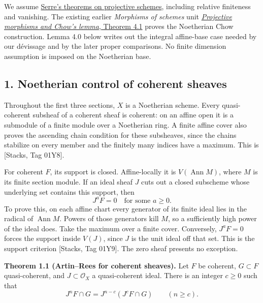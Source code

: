 \documentclass[11pt]{article}
\begin{document}
We assume \href{serres-theorems-on-projective-schemes.md}{Serre's
theorems on projective schemes}, including relative finiteness and
vanishing. The existing earlier \emph{Morphisms of schemes} unit
\href{../AG-GS/prerequisites/AG-MO/projective-morphisms-and-chows-lemma.html}{\emph{Projective
morphisms and Chow's lemma}, Theorem 4.1} proves the Noetherian Chow
construction. Lemma 4.0 below writes out the integral affine-base case
needed by our dévissage and by the later proper comparisons. No finite
dimension assumption is imposed on the Noetherian base.

\subsection{1. Noetherian control of coherent
sheaves}\label{noetherian-control-of-coherent-sheaves}

Throughout the first three sections, \(X\) is a Noetherian scheme. Every
quasi-coherent subsheaf of a coherent sheaf is coherent: on an affine
open it is a submodule of a finite module over a Noetherian ring. A
finite affine cover also proves the ascending chain condition for these
subsheaves, since the chains stabilize on every member and the finitely
many indices have a maximum. This is {[}Stacks, Tag 01Y8{]}.

For coherent \(F\), its support is closed. Affine-locally it is
\(V(\operatorname{Ann}M)\), where \(M\) is its finite section module. If
an ideal sheaf \(J\) cuts out a closed subscheme whose underlying set
contains this support, then \[
J^aF=0\quad\text{for some }a\ge0.
\] To prove this, on each affine chart every generator of its finite
ideal lies in the radical of \(\operatorname{Ann}M\). Powers of those
generators kill \(M\), so a sufficiently high power of the ideal does.
Take the maximum over a finite cover. Conversely, \(J^aF=0\) forces the
support inside \(V(J)\), since \(J\) is the unit ideal off that set.
This is the support criterion {[}Stacks, Tag 01Y9{]}. The zero sheaf
presents no exception.

\textbf{Theorem 1.1 (Artin--Rees for coherent sheaves).} Let \(F\) be
coherent, \(G\subset F\) quasi-coherent, and \(J\subset\mathcal O_X\) a
quasi-coherent ideal. There is an integer \(c\ge0\) such that \[
J^nF\cap G=J^{n-c}(J^cF\cap G)\qquad(n\ge c).
\]
\end{document}
